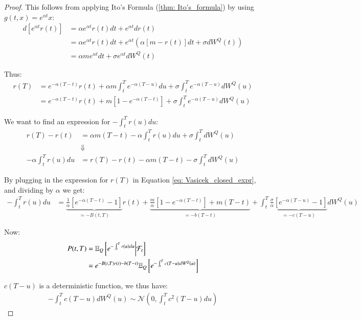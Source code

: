 \begin{proof}
This follows from applying Ito's Formula (\ref{thm: Ito's_formula}) by using  $g(t,x) = e^{\alpha t}x$: 
\begin{align*}
d[e^{\alpha t}r(t)] &= 
\alpha e^{\alpha t}r(t)dt + e^{\alpha t}dr(t) \\ 
&= 
\alpha e^{\alpha t}r(t)dt + e^{\alpha t}\left(\alpha[m - r(t)]dt + \sigma dW^{Q}(t)\right) \\ 
&= 
\alpha m e^{\alpha t}dt + \sigma e^{\alpha t}dW^{Q}(t)
\end{align*}

Thus: 
\begin{align}
\label{eq: Vasicek_closed_expr}
r(T) &= e^{-\alpha(T-t)}r(t) + \alpha m \int_{t}^{T}e^{-\alpha(T-u)}du + \sigma \int_{t}^{T}e^{-\alpha(T-u)}dW^{Q}(u)
\nonumber
\\ 
&= 
e^{-\alpha(T-t)}r(t) + m[1-e^{-\alpha(T-t)}] 
+ \sigma \int_{t}^{T}e^{-\alpha(T-u)}dW^{Q}(u)
\end{align}

We want to find an expression for $-\int_{t}^{T}r(u)du$: 
\begin{align*}
 r(T) - r(t) 
 &= 
 \alpha m(T-t)- \alpha\int_{t}^{T}r(u)du + \sigma\int_{t}^{T}dW^{Q}(u) \\ 
 &\Downarrow \\ 
- \alpha\int_{t}^{T}r(u)du &= 
r(T) - r(t) -\alpha m(T-t)-\sigma \int_{t}^{T}dW^{Q}(u)
\end{align*}

By plugging in the expression for $r(T)$ in Equation \ref{eq: Vasicek_closed_expr}, and dividing by $\alpha$ we get: 
\begin{align}
\label{eq: Vasicek_closed_expr_integral}
-\int_{t}^{T}r(u)du 
&= 
\underbrace{
\frac{1}{\alpha}[e^{-\alpha(T-t)}-1]}_{= -B(t,T)}
r(t) + \underbrace{
\frac{m}{\alpha}[1-e^{-\alpha(T-t)}] + m(T-t)
}_{= -b(T-t)} 
+
\int_{t}^{T}
\underbrace{
\frac{\sigma}{\alpha}[e^{-\alpha(T-u)}-1]
}_{= -c(T-u)}
dW^{Q}(u)
\end{align}

Now: 
\begin{align*}
P(t,T) 
&= 
\mathbb{E}_{Q}\left[e^{-\int_{t}^{T}r(u)du}\bigg{|}\mathcal{F}_{t}\right] \\ 
&= e^{
-B(t,T)r(t) -b(T-t)
}
\mathbb{E}_{Q}\left[
e^{
-\int_{t}^{T}c(T-u)dW^{Q}(u)
}
\right]
\end{align*}

$c(T-u)$ is a deterministic function, we thus have: 
\begin{align*}
 -\int_{t}^{T}c(T-u)dW^{Q}(u) \sim 
 \mathcal{N}\left(
 0, \int_{t}^{T}c^{2}(T-u)du
 \right)
\end{align*}


\end{proof}
